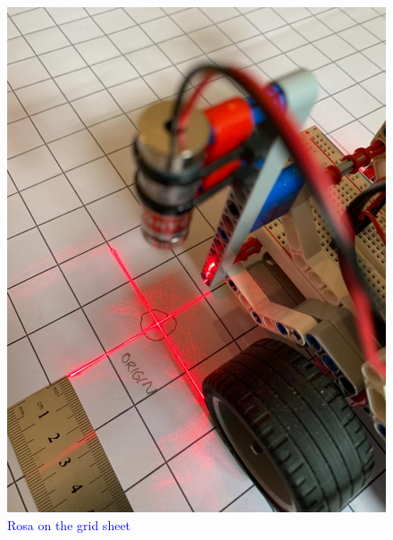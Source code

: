 {\begin{itemize}
        \begin{figure}[!ht] %
            \centering
            \includegraphics[scale=0.3]{images/Measurement Facility.jpeg}
            \caption{\textcolor{blue}{Rosa on the grid sheet}}
            \label{fig:Method of measuring grid}
        \end{figure}
        

\end{itemize}}
